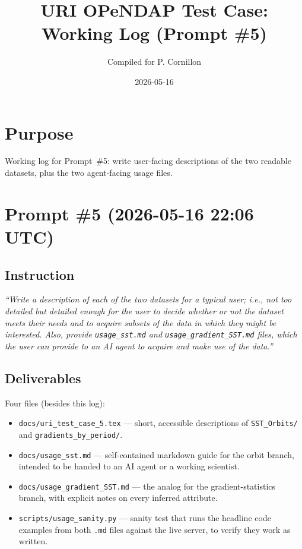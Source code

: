 \documentclass[11pt]{article}
\title{URI OPeNDAP Test Case: Working Log (Prompt \#5)}
\author{Compiled for P. Cornillon}
\date{2026-05-16}
\begin{document}
\maketitle

\section*{Purpose}

Working log for Prompt~\#5: write user-facing descriptions of the
two readable datasets, plus the two agent-facing usage files.

\section{Prompt \#5 (2026-05-16 22:06 UTC)}

\subsection{Instruction}

\emph{``Write a description of each of the two datasets for a
typical user; i.e., not too detailed but detailed enough for the
user to decide whether or not the dataset meets their needs and to
acquire subsets of the data in which they might be interested.
Also, provide \texttt{usage\_sst.md} and
\texttt{usage\_gradient\_SST.md} files, which the user can provide
to an AI agent to acquire and make use of the data.''}

\subsection{Deliverables}

Four files (besides this log):

\begin{itemize}
  \item \texttt{docs/uri\_test\_case\_5.tex} --- short, accessible
    descriptions of \texttt{SST\_Orbits/} and
    \texttt{gradients\_by\_period/}.
  \item \texttt{docs/usage\_sst.md} --- self-contained markdown
    guide for the orbit branch, intended to be handed to an AI
    agent or a working scientist.
  \item \texttt{docs/usage\_gradient\_SST.md} --- the analog for
    the gradient-statistics branch, with explicit notes on every
    inferred attribute.
  \item \texttt{scripts/usage\_sanity.py} --- sanity test that
    runs the headline code examples from both \texttt{.md} files
    against the live server, to verify they work as written.
\end{itemize}
\end{document}
